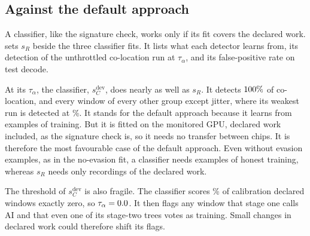 \subsection{Against the default approach}\label{s:missed}

A classifier, like the signature check, works only if its fit covers the declared work.
 sets $s_R$ beside the three classifier fits. It lists what each detector
learns from, its detection of the unthrottled co-location run at $\tau_\alpha$, and its
false-positive rate on test decode.

\begin{table}[!tp]
  \centering
  \small
  
  \caption{The data each detector learns from, its detection of the unthrottled run at
    $\tau_\alpha$, and its false-positive rate on test decode. ``pub.'': traces recorded
    on the same GPU and probe to the published design, not among the \NCaptures{}
    runs of \cref{s:corpus}. An alarm of $s_R$ means ``undeclared''; an alarm of a
    classifier means ``training''. The rows for the replica and the no-evasion fit are
    exploratory.}
  \label{t:t6}
\end{table}

At its $\tau_\alpha$, the classifier, $s_C^{\mathrm{dev}}$, does nearly as well as $s_R$.
It detects $100\%$ of co-location, and every window of every other group except
jitter, where its weakest run is detected at \ClfJitterWorst\%. It stands for the
default approach because it learns from examples of training. But it is fitted on the
monitored GPU, declared work included, as the signature check is, so it needs no
transfer between chips. It is therefore the most favourable case of the default
approach. Even without evasion examples, as in the no-evasion fit, a classifier
needs examples of honest training, whereas $s_R$ needs only recordings of the declared
work.

The threshold of $s_C^{\mathrm{dev}}$ is also fragile. The classifier scores
\FracCalZero\% of calibration declared windows exactly zero, so
$\tau_\alpha = 0.0$. It then flags any window that stage one calls AI and that even
one of its \ForestTrees{} stage-two trees votes as training. Small changes in declared
work could therefore shift its flags.

